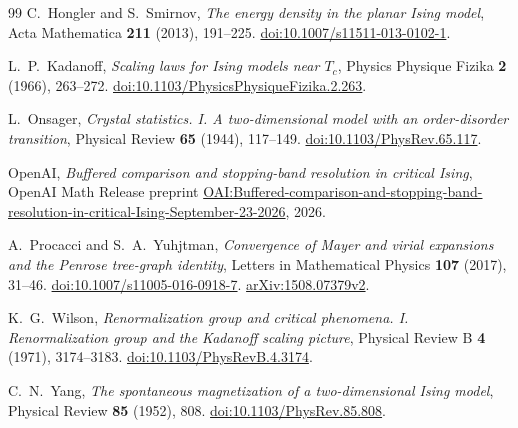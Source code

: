 \begin{thebibliography}{99}
C.~Hongler and S.~Smirnov,
\emph{The energy density in the planar Ising model},
Acta Mathematica \textbf{211} (2013), 191--225.
\href{https://doi.org/10.1007/s11511-013-0102-1}{doi:10.1007/s11511-013-0102-1}.

L.~P.~Kadanoff,
\emph{Scaling laws for Ising models near $T_c$},
Physics Physique Fizika \textbf{2} (1966), 263--272.
\href{https://doi.org/10.1103/PhysicsPhysiqueFizika.2.263}{doi:10.1103/PhysicsPhysiqueFizika.2.263}.

L.~Onsager,
\emph{Crystal statistics. I. A two-dimensional model with an order-disorder transition},
Physical Review \textbf{65} (1944), 117--149.
\href{https://doi.org/10.1103/PhysRev.65.117}{doi:10.1103/PhysRev.65.117}.

OpenAI,
\emph{Buffered comparison and stopping-band resolution in critical Ising},
OpenAI Math Release preprint
\href{https://github.com/openai/math/blob/main/preprints/Buffered-comparison-and-stopping-band-resolution-in-critical-Ising-September-23-2026/paper.pdf}{OAI:Buffered-comparison-and-stopping-band-resolution-in-critical-Ising-September-23-2026},
2026.

A.~Procacci and S.~A.~Yuhjtman,
\emph{Convergence of Mayer and virial expansions and the Penrose tree-graph identity},
Letters in Mathematical Physics \textbf{107} (2017), 31--46.
\href{https://doi.org/10.1007/s11005-016-0918-7}{doi:10.1007/s11005-016-0918-7}.
\href{https://arxiv.org/abs/1508.07379v2}{arXiv:1508.07379v2}.

K.~G.~Wilson,
\emph{Renormalization group and critical phenomena. I. Renormalization group and the Kadanoff scaling picture},
Physical Review B \textbf{4} (1971), 3174--3183.
\href{https://doi.org/10.1103/PhysRevB.4.3174}{doi:10.1103/PhysRevB.4.3174}.

C.~N.~Yang,
\emph{The spontaneous magnetization of a two-dimensional Ising model},
Physical Review \textbf{85} (1952), 808.
\href{https://doi.org/10.1103/PhysRev.85.808}{doi:10.1103/PhysRev.85.808}.

\end{thebibliography}
\endgroup
